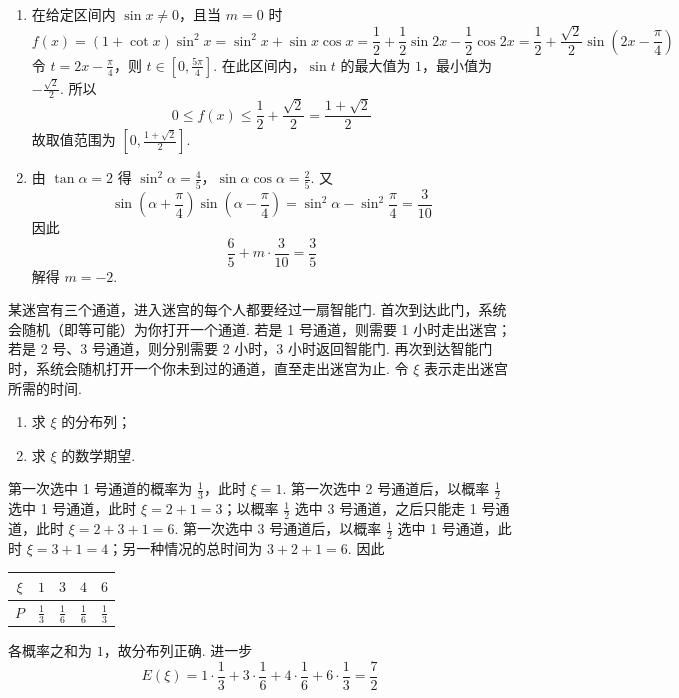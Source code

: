 \begin{solution}
\begin{enumerate}
\item 在给定区间内 \(\sin x\neq0\)，且当 \(m=0\) 时
\[
f(x)=(1+\cot x)\sin^2x=\sin^2x+\sin x\cos x
=\frac12+\frac12\sin2x-\frac12\cos2x
=\frac12+\frac{\sqrt2}{2}\sin\left(2x-\frac\pi4\right)
\]
令 \(t=2x-\frac\pi4\)，则 \(t\in\left[0,\frac{5\pi}{4}\right]\). 在此区间内，\(\sin t\) 的最大值为 \(1\)，最小值为 \(-\frac{\sqrt2}{2}\). 所以
\[
0\leqslant f(x)\leqslant\frac12+\frac{\sqrt2}{2}=\frac{1+\sqrt2}{2}
\]
故取值范围为 \(\left[0,\frac{1+\sqrt2}{2}\right]\).
\item 由 \(\tan\alpha=2\) 得
\(\sin^2\alpha=\frac45\)，\(\sin\alpha\cos\alpha=\frac25\).
又
\[
\sin\left(\alpha+\frac\pi4\right)\sin\left(\alpha-\frac\pi4\right)
=\sin^2\alpha-\sin^2\frac\pi4=\frac{3}{10}
\]
因此
\[
\frac65+m\cdot\frac3{10}=\frac35
\]
解得 \(m=-2\).
\end{enumerate}
\end{solution}

\begin{problem}
某迷宫有三个通道，进入迷宫的每个人都要经过一扇智能门. 首次到达此门，系统会随机（即等可能）为你打开一个通道. 若是 1 号通道，则需要 1 小时走出迷宫；若是 2 号、3 号通道，则分别需要 2 小时，3 小时返回智能门. 再次到达智能门时，系统会随机打开一个你未到过的通道，直至走出迷宫为止. 令 \(\xi\) 表示走出迷宫所需的时间.

\begin{enumerate}
\item 求 \(\xi\) 的分布列；
\item 求 \(\xi\) 的数学期望.
\end{enumerate}
\end{problem}

\begin{solution}
第一次选中 1 号通道的概率为 \(\frac13\)，此时 \(\xi=1\). 第一次选中 2 号通道后，以概率 \(\frac12\) 选中 1 号通道，此时 \(\xi=2+1=3\)；以概率 \(\frac12\) 选中 3 号通道，之后只能走 1 号通道，此时 \(\xi=2+3+1=6\). 第一次选中 3 号通道后，以概率 \(\frac12\) 选中 1 号通道，此时 \(\xi=3+1=4\)；另一种情况的总时间为 \(3+2+1=6\). 因此
\begin{center}
\begin{tabular}{c|cccc}
\(\xi\)&\(1\)&\(3\)&\(4\)&\(6\)\\
\hline
\(P\)&\(\frac13\)&\(\frac16\)&\(\frac16\)&\(\frac13\)
\end{tabular}
\end{center}
各概率之和为 \(1\)，故分布列正确. 进一步
\[
E(\xi)=1\cdot\frac13+3\cdot\frac16+4\cdot\frac16+6\cdot\frac13=\frac72
\]
\end{solution}

